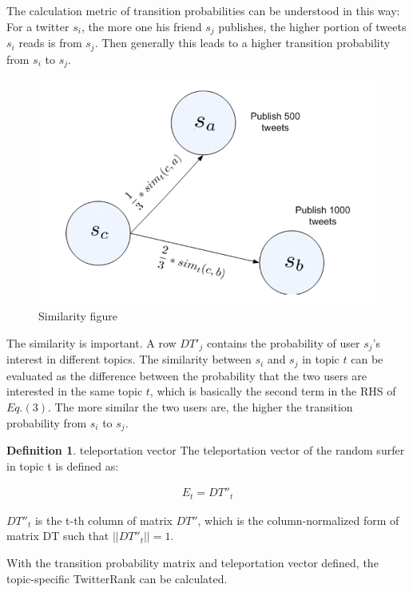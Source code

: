 \documentclass[conference]{IEEEtran}
\theoremstyle{definition}
\newtheorem{definition}{Definition}
\begin{document}
The calculation metric of transition probabilities can be understood in this way: For a \textup{twitter} $s_i$, the more one his friend $s_j$ publishes, the higher portion of tweets $s_i$ reads is from $s_j$. Then generally this leads to a higher transition probability from $s_i$ to $s_j$. 


\begin{figure}[htb]
\centerline{\includegraphics{twitterers.png}}
\caption{Similarity figure}
\label{fig}
\end{figure}


The similarity is important. A row $DT'_j$ contains the probability of user $s_j$’s interest in different topics. The similarity between $s_i$ and $s_j$ in topic $t$ can be evaluated as the difference between the probability that the two users are interested in the same topic $t$, which is basically the second term in the RHS of $Eq.(3)$. The more similar the two users are, the higher the transition probability from $s_i$ to $s_j$.



\theoremstyle{definition}
\begin{definition}{teleportation vector}
	The teleportation vector of the random surfer in topic t is defined as: 
	
	\begin{align}
	E_t = DT''_t
	\end{align}
	
	$DT''_t$ is the t-th column of matrix $DT''$, which is the column-normalized form of matrix DT such that $||DT''_t|| = 1$. 
	
	
\end{definition}


With the transition probability matrix and teleportation vector defined, the topic-specific \textup{TwitterRank} can be calculated.
\end{document}
